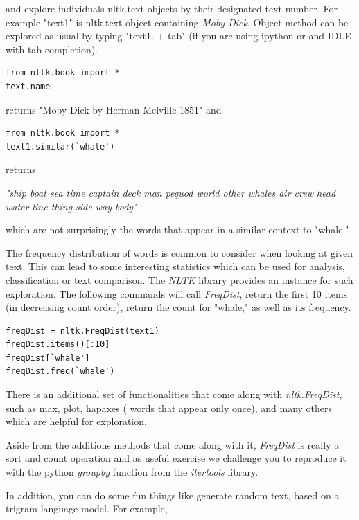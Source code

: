 and explore individuals nltk.text objects by their designated text number. For example "text1" is nltk.text object containing 
\textit{Moby Dick}. Object method can be explored as usual by typing "text1. + tab" (if you are using ipython or and IDLE with tab 
completion). 

\begin{verbatim}
from nltk.book import *
text.name
\end{verbatim}

\noindent returns "Moby Dick by Herman Melville 1851" and

\begin{verbatim}
from nltk.book import *
text1.similar(`whale')
\end{verbatim}

\noindent returns 

\vspace{0.1in}
\noindent\textit{"ship boat sea time captain deck man pequod world other whales air crew
head water line thing side way body"}
\vspace{0.1in}


\noindent which are not surprisingly the words that appear in a similar context to "whale."



The frequency distribution of words is common to consider when looking at given text. This can lead to some interesting 
statistics which can be used for analysis, classification or text comparison. The \textit{NLTK} library provides 
an instance for such exploration. The following commands will call \textit{FreqDist}, return the first 10 items (in decreasing 
count order), return the count for "whale," as well as its frequency. 

\begin{verbatim}
freqDist = nltk.FreqDist(text1)
freqDist.items()[:10]
freqDist[`whale']
freqDist.freq(`whale')
\end{verbatim}

There is an additional set of functionalities that come along with \textit{nltk.FreqDist}, such as max, plot, hapaxes (
words that appear only once), and many others which are helpful for exploration. 

Aside from the additions methods that come along with it, \textit{FreqDist} is really a sort and count operation and as 
useful exercise we challenge you to reproduce it with the python \textit{groupby} function from the \textit{itertools} 
library. 


In addition, you can do some fun things like generate random text, based on a trigram language model. For example,


